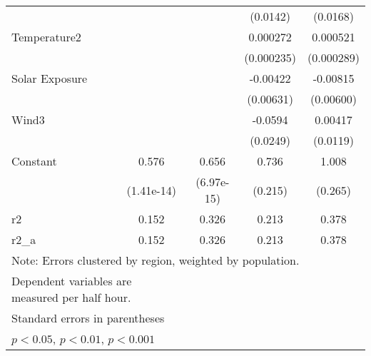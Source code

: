 \begin{table}[!htbp]
\begin{tabular}{l*{4}{c}}
                    &                     &                     &    (0.0142)         &    (0.0168)         \\
[1em]
Temperature2 &                     &                     &    0.000272         &    0.000521         \\
                    &                     &                     &  (0.000235)         &  (0.000289)         \\
[1em]
Solar Exposure &                     &                     &    -0.00422         &    -0.00815         \\
                    &                     &                     &   (0.00631)         &   (0.00600)         \\
[1em]
Wind3 &                     &                     &     -0.0594         &     0.00417         \\
                    &                     &                     &    (0.0249)         &    (0.0119)         \\
[1em]
Constant            &       0.576\sym{***}&       0.656\sym{***}&       0.736\sym{*}  &       1.008\sym{*}  \\
                    &  (1.41e-14)         &  (6.97e-15)         &     (0.215)         &     (0.265)         \\
\hline
r2                  &       0.152         &       0.326         &       0.213         &       0.378         \\
r2\_a                &       0.152         &       0.326         &       0.213         &       0.378         \\
\hline\hline
\multicolumn{5}{l}{Note: Errors clustered by region, weighted by population.} \\
\multicolumn{2}{l}{Dependent variables are measured per half hour.} \\
\multicolumn{5}{l}{\footnotesize Standard errors in parentheses}\\
\multicolumn{5}{l}{\footnotesize \sym{*} \(p<0.05\), \sym{**} \(p<0.01\), \sym{***} \(p<0.001\)}\\
\end{tabular}
\end{table}
